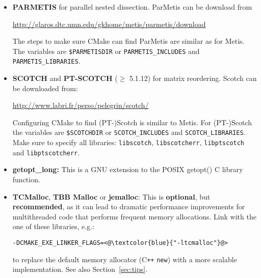 \documentclass{article}
\begin{document}
\begin{itemize}
  \url{http://glaros.dtc.umn.edu/gkhome/metis/metis/download}.

  CMake looks for the Metis inlude files the library in the default
  locations as well as in
  \lstinline[style=Bash]!$METISDIR/include!  and
  \lstinline[style=Bash]!$METISDIR/lib!. Using the Bash shell, the
  METISDIR environment variable can be set as\\
  \lstinline[style=Bash]!export METISDIR=/usr/local/metis/!.
  Alternatively, you can specify the
  location of the header and library as follows:
  \begin{lstlisting}[style=Bash]
    > cmake <@\textcolor{blue}{../}@> -DCMAKE_BUILD_TYPE=<@\textcolor{blue}{Release}@> \
      -DMETIS_INCLUDES=<@\textcolor{blue}{/usr/local/metis/include}@> \
      -DMETIS_LIBRARIES=<@\textcolor{blue}{/usr/local/metis/lib/libmetis.a}@>
  \end{lstlisting}

\item \textbf{PARMETIS} for parallel nested dissection. ParMetis can
  be download from

  \url{http://glaros.dtc.umn.edu/gkhome/metis/parmetis/download}

  The steps to make sure CMake can find ParMetis are similar as for
  Metis. The variables are
  \lstinline[style=Bash]!$PARMETISDIR! or
  \lstinline[style=Bash]!PARMETIS_INCLUDES! and
  \lstinline[style=Bash]!PARMETIS_LIBRARIES!.

\item \textbf{SCOTCH} and \textbf{PT-SCOTCH} ($\geq$ 5.1.12) for
  matrix reordering. Scotch can be downloaded from:

  \url{http://www.labri.fr/perso/pelegrin/scotch/}

  Configuring CMake to find (PT-)Scotch is similar to Metis. For
  (PT-)Scotch the variables are
  \lstinline[style=Bash]!$SCOTCHDIR! or
  \lstinline[style=Bash]!SCOTCH_INCLUDES! and
  \lstinline[style=Bash]!SCOTCH_LIBRARIES!. Make sure to specify all
  libraries: \lstinline[style=Bash]!libscotch!,
  \lstinline[style=Bash]!libscotcherr!,
  \lstinline[style=Bash]!libptscotch! and
  \lstinline[style=Bash]!libptscotcherr!.

\item \textbf{getopt\_long:} This is a GNU extension to the POSIX
  getopt() C library function.
\item \textbf{TCMalloc}, \textbf{TBB Malloc} or \textbf{jemalloc}:
  This is \textbf{optional}, but \textbf{recommended}, as it can lead
  to dramatic performance improvements for multithreaded code that
  performs frequent memory allocations. Link with the one of these
  libraries, e.g.:
  \begin{lstlisting}[style=Bash]
  -DCMAKE_EXE_LINKER_FLAGS=<@\textcolor{blue}{"-ltcmalloc"}@>
  \end{lstlisting}
  to replace the default memory allocator (C\texttt{++} \texttt{new})
  with a more scalable implementation. See also
  Section~\ref{sec:tips}.
\end{itemize}
\end{document}
